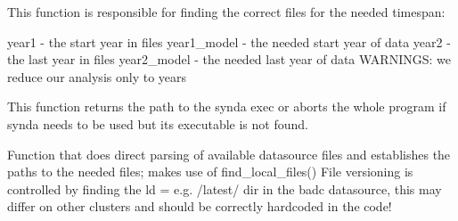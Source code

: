 \documentclass[letterpaper,10pt,english]{sphinxmanual}
\begin{document}

\begin{fulllineitems}
\label{\detokenize{index:cmip5datafinder.time_handling}}
This function is responsible for finding the correct
files for the needed timespan:

year1 - the start year in files
year1\_model - the needed start year of data
year2 - the last year in files
year2\_model - the needed last year of data
WARNINGS:
we reduce our analysis only to years

\end{fulllineitems}


\begin{fulllineitems}
\label{\detokenize{index:cmip5datafinder.which_synda}}
This function returns the path to the synda exec
or aborts the whole program if synda needs to be used
but its executable is not found.

\end{fulllineitems}


\begin{fulllineitems}
\label{\detokenize{index:cmip5datafinder.write_cache_direct}}
Function that does direct parsing of available datasource files and establishes
the paths to the needed files; makes use of find\_local\_files()
File versioning is controlled by finding the ld = e.g. /latest/ dir
in the badc datasource, this may differ on other clusters and should be correctly
hardcoded in the code!

\end{fulllineitems}

\end{document}
